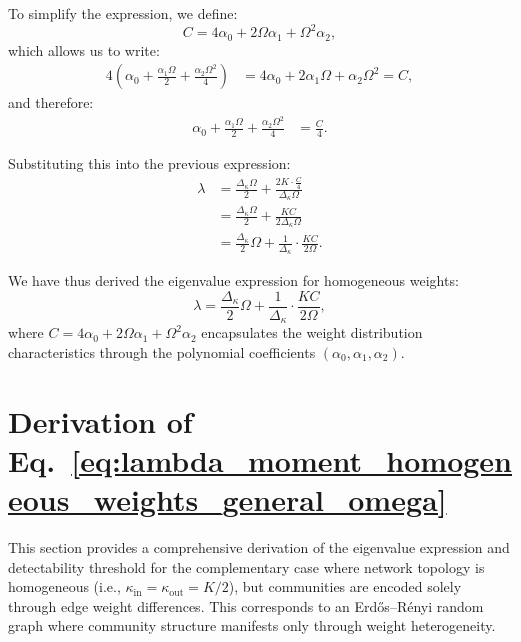 \documentclass[a4paper,pre,superscriptaddress,floatfix,nofootinbib,twocolumn]{revtex4-1}
\begin{document}
To simplify the expression, we define:
\begin{equation*}
C = 4\alpha_0 + 2\Omega\alpha_1 + \Omega^2\alpha_2,
\end{equation*}
which allows us to write:
\begin{align*}
4\left(\alpha_0 + \frac{\alpha_1 \Omega}{2} + \frac{\alpha_2 \Omega^2}{4}\right) &= 4\alpha_0 + 2\alpha_1\Omega + \alpha_2\Omega^2 = C,
\end{align*}
and therefore:
\begin{align*}
\alpha_0 + \frac{\alpha_1 \Omega}{2} + \frac{\alpha_2 \Omega^2}{4} &= \frac{C}{4}.
\end{align*}

Substituting this into the previous expression:
\begin{align*}
\lambda &= \frac{\Delta_\kappa \Omega}{2} + \frac{2K \cdot \frac{C}{4}}{\Delta_\kappa \Omega}\\
&= \frac{\Delta_\kappa \Omega}{2} + \frac{KC}{2\Delta_\kappa \Omega}\\
&= \frac{\Delta_\kappa}{2}\Omega + \frac{1}{\Delta_\kappa} \cdot \frac{KC}{2\Omega}.
\end{align*}

We have thus derived the eigenvalue expression for homogeneous weights:
\begin{equation}
\boxed{\lambda = \frac{\Delta_\kappa}{2}\Omega + \frac{1}{\Delta_\kappa} \cdot \frac{KC}{2\Omega}},
\end{equation}
where $C = 4\alpha_0 + 2\Omega\alpha_1 + \Omega^2\alpha_2$ encapsulates the weight distribution characteristics through the polynomial coefficients $(\alpha_0, \alpha_1, \alpha_2)$.


\section{Derivation of Eq.~\eqref{eq:lambda_moment_homogeneous_weights_general_omega}}
\label{sec:detailed_derivation_homogeneous_topology}

This section provides a comprehensive derivation of the eigenvalue expression and detectability threshold for the complementary case where network topology is homogeneous (i.e., $\kappa_\text{in} = \kappa_\text{out} = K/2$), but communities are encoded solely through edge weight differences. This corresponds to an Erdős–Rényi random graph where community structure manifests only through weight heterogeneity.
\end{document}
